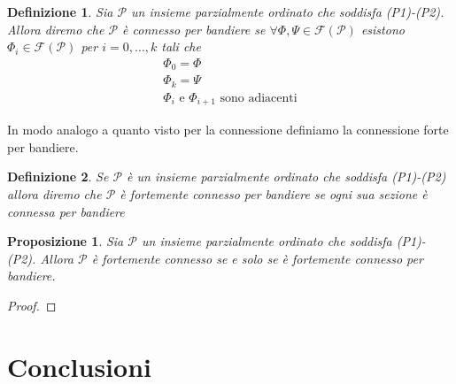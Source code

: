 \documentclass[12pt,a4paper,twoside]{book}
\newcommand{\p}{\mathcal{P}}
\newtheorem{defin}{Definizione}
\newtheorem{prop}{Proposizione}
\begin{document}
\begin{defin}
Sia $\p$ un insieme parzialmente ordinato che soddisfa (P1)-(P2). Allora diremo che $\p$ \`e connesso per bandiere se $\forall\Phi,\Psi\in\mathcal{F}(\p)$
esistono $\Phi_i\in\mathcal{F}(\p)$ per $i=0,\dots,k$ tali che
\begin{gather*}
\Phi_0=\Phi\\
\Phi_k=\Psi\\
\Phi_i\text{ e }\Phi_{i+1}\text{ sono adiacenti}
\end{gather*}
\end{defin}
In modo analogo a quanto visto per la connessione definiamo la connessione forte per bandiere.
\begin{defin}
Se $\p$ \`e un insieme parzialmente ordinato che soddisfa (P1)-(P2) allora diremo che $\p$ \`e \emph{fortemente connesso per bandiere} se
ogni sua sezione \`e connessa per bandiere
\end{defin}

\begin{prop}
Sia $\p$ un insieme parzialmente ordinato che soddisfa (P1)-(P2). Allora $\p$ \`e fortemente connesso se e solo se \`e fortemente
connesso per bandiere.
\end{prop}
\begin{proof}

\end{proof}


\chapter{Conclusioni}

\end{document}
